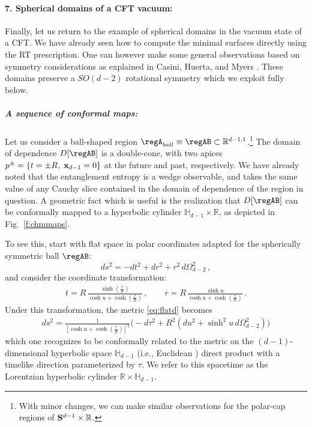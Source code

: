 \documentclass[12pt,openany]{book}
\begin{document}
\paragraph{7. Spherical domains of a CFT vacuum:} Finally, let us return to the example of spherical domains in the vacuum state of a CFT. We have already seen how to compute the minimal surfaces directly using the RT prescription. One can however make some general observations based on symmetry considerations as explained in Casini, Huerta, and Myers \cite{Casini:2011kv}. These domains preserve a $SO(d-2)$ rotational symmetry which we exploit fully below.


\subparagraph{A sequence of conformal maps:}
Let us consider a ball-shaped region $\regA_{ball} \equiv \regAB \subset {\mathbb R}^{d-1,1}$.\footnote{ With minor changes, we can make similar observations for the polar-cap regions of ${\bf S}^{d-1} \times {\mathbb R}$.} The domain of dependence $D[\regAB]$ is a double-cone, with two apices  $p^\pm = \{t=\pm R, \; {\bf x}_{d-1} = 0\}$ at the future and past, respectively. We have already noted that the entanglement entropy is a wedge observable, and takes the same value of any Cauchy slice contained in the domain of dependence of the region in question. A geometric fact which is useful is the realization that
$D[\regAB]$ can be conformally mapped to a hyperbolic cylinder $\mathbb{H}_{d-1} \times \mathbb{R}$, as depicted in Fig.~\ref{f:chmmaps}.

To see this, start with flat space in polar coordinates adapted for the spherically symmetric ball $\regAB$:
%
\begin{equation}
ds^2  = -dt^2 + dr^2 + r^2\, d\Omega_{d-2}^2\,,
\label{eq:flatd}
\end{equation}
%
and consider the coordinate transformation:
%
\begin{align}
t = R\, \frac{\sinh\left(\frac{\tau}{R}\right)}{\cosh u + \cosh\left(\frac{\tau}{R}\right)} \,, \qquad r = R\, \frac{\sinh u }{\cosh u + \cosh\left(\frac{\tau}{R}\right)}\,.
\label{eq:hycoord}
\end{align}
%
Under this transformation, the metric \eqref{eq:flatd} becomes
%
\begin{align}
ds^2 = \frac{1}{\left[\cosh u + \cosh\left(\frac{\tau}{R}\right) \right]^2 }{}
\Bigg(-d\tau^2 +  R^2 \left(du^2  + \sinh^2 u \, d\Omega_{d- 2}^2\right)\Bigg)
\label{eq:hypc}
\end{align}
%
which one recognizes to be conformally related to the metric on the $(d-1)$-dimensional hyperbolic space ${\mathbb H}_{d-1}$ (i.e., Euclidean ) direct product with a timelike direction parameterized by $\tau$. We refer to this spacetime as the Lorentzian hyperbolic cylinder ${\mathbb R} \times {\mathbb H}_{d-1}$.
\end{document}
